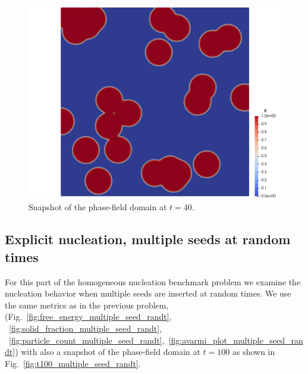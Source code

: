 \documentclass[preprint,12pt]{elsarticle}
\begin{document}
%
\begin{center}
\begin{figure} 
\begin{centering}
\includegraphics[scale=0.80]{t40_multiple_seed_t0.PNG}
\par\end{centering}
\caption{Snapshot of the phase-field domain at $t=40$.} \label{fig:t40_multiple_seed_t0}
\end{figure}
\par\end{center}

\subsection{Explicit nucleation, multiple seeds at random times}

For this part of the homogeneous nucleation benchmark problem we examine the nucleation behavior when multiple seeds are inserted at random times. We use the same metrics as in the previous problem,  (Fig.~\ref{fig:free_energy_multiple_seed_randt}, ~\ref{fig:solid_fraction_multiple_seed_randt}, ~\ref{fig:particle_count_multiple_seed_randt},~\ref{fig:avarmi_plot_multiple_seed_randt}) with also a snapshot of the phase-field domain at $t=100$ as shown in Fig.~\ref{fig:t100_multiple_seed_randt}. %
\end{document}
